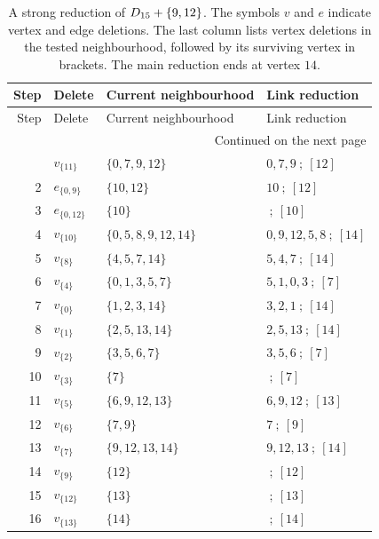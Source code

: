 \begingroup\small
\setlength{\tabcolsep}{3pt}
\begin{longtable}{rlll}
\caption{A strong reduction of $D_{15}+\{9,12\}$. The symbols $v$ and $e$ indicate vertex and edge deletions. The last column lists vertex deletions in the tested neighbourhood, followed by its surviving vertex in brackets. The main reduction ends at vertex $14$.}\label{tab:d15}\\
\toprule
Step & Delete & Current neighbourhood & Link reduction \\
\midrule\endfirsthead
\toprule
Step & Delete & Current neighbourhood & Link reduction \\
\midrule\endhead
\midrule\multicolumn{4}{r}{Continued on the next page}\\
\endfoot\bottomrule\endlastfoot
1 & $v_{\{11\}}$ & $\{0,7,9,12\}$ & $0,7,9\ ;\ [12]$ \\
2 & $e_{\{0,9\}}$ & $\{10,12\}$ & $10\ ;\ [12]$ \\
3 & $e_{\{0,12\}}$ & $\{10\}$ & $\ ;\ [10]$ \\
4 & $v_{\{10\}}$ & $\{0,5,8,9,12,14\}$ & $0,9,12,5,8\ ;\ [14]$ \\
5 & $v_{\{8\}}$ & $\{4,5,7,14\}$ & $5,4,7\ ;\ [14]$ \\
6 & $v_{\{4\}}$ & $\{0,1,3,5,7\}$ & $5,1,0,3\ ;\ [7]$ \\
7 & $v_{\{0\}}$ & $\{1,2,3,14\}$ & $3,2,1\ ;\ [14]$ \\
8 & $v_{\{1\}}$ & $\{2,5,13,14\}$ & $2,5,13\ ;\ [14]$ \\
9 & $v_{\{2\}}$ & $\{3,5,6,7\}$ & $3,5,6\ ;\ [7]$ \\
10 & $v_{\{3\}}$ & $\{7\}$ & $\ ;\ [7]$ \\
11 & $v_{\{5\}}$ & $\{6,9,12,13\}$ & $6,9,12\ ;\ [13]$ \\
12 & $v_{\{6\}}$ & $\{7,9\}$ & $7\ ;\ [9]$ \\
13 & $v_{\{7\}}$ & $\{9,12,13,14\}$ & $9,12,13\ ;\ [14]$ \\
14 & $v_{\{9\}}$ & $\{12\}$ & $\ ;\ [12]$ \\
15 & $v_{\{12\}}$ & $\{13\}$ & $\ ;\ [13]$ \\
16 & $v_{\{13\}}$ & $\{14\}$ & $\ ;\ [14]$ \\
\end{longtable}\endgroup
